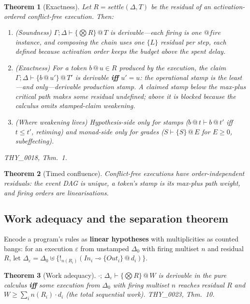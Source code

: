 \documentclass[11pt]{article}
\makeatletter
\newcommand{\lax}[2]{\{#1\}\mathbin{@}#2}       %
\newcommand{\gbang}[1]{{!}_{#1}}                 %
\newcommand{\loli}{\multimap}                    %
\newcommand{\stmp}[2]{#1\mathbin{@}#2}           %
\newcommand{\settle}{\mathit{settle}}
\newtheorem{theorem}{Theorem}[section]
\theoremstyle{definition}
\theoremstyle{remark}
\makeatother
\begin{document}
\begin{theorem}[Exactness]
\label{thm:exact}
Let $R = \settle(\Delta, T)$ be the residual of an activation-ordered
conflict-free execution.  Then:
\begin{enumerate}
\item \emph{(Soundness)} $\Gamma; \Delta \vdash \lax{\bigotimes R}{T}$ is
  derivable---each firing is one $\mathit{@fire}$ instance, and composing the chain
  uses one $\mathit{\{L\}}$ residual per step, each \emph{defined} because
  activation order keeps the budget above the spent delay.
\item \emph{(Exactness)} For a token $\stmp{b}{u} \in R$ produced by the
  execution, the claim $\Gamma; \Delta \vdash \lax{\stmp{b}{u'}}{T'}$ is derivable
  \textbf{iff} $u' = u$: the operational stamp is the least---and \emph{only}---derivable
  production stamp.  A claimed stamp below the max-plus critical path makes some
  residual undefined; above it is blocked because the calculus omits stamped-claim
  weakening.
\item \emph{(Where weakening lives)} Hypothesis-side only for stamps ($\stmp{b}{t}
  \vdash \stmp{b}{t'}$ iff $t \leq t'$, retiming) and monad-side only for grades
  ($S \vdash \lax{S}{E}$ for $E \geq 0$, subeffecting).
\end{enumerate}
THY\_0018, Thm.~1.
\end{theorem}

\begin{theorem}[Timed confluence]
\label{thm:confluence}
Conflict-free executions have order-independent residuals: the event DAG is unique,
a token's stamp is its max-plus path weight, and firing orders are linearisations.
\end{theorem}

\subsection{Work adequacy and the separation theorem}

Encode a program's rules as \textbf{linear hypotheses} with multiplicities as
counted bangs: for an execution $\varepsilon$ from unstamped $\Delta_0$ with
firing multiset $n$ and residual $R$, let $\Delta_\varepsilon = \Delta_0 \uplus
\{\gbang{n(R_i)}(In_i \loli \lax{Out_i}{d_i})\}$.

\begin{theorem}[Work adequacy]
\label{thm:work}
$\cdot;\, \Delta_\varepsilon \vdash \lax{\bigotimes R}{W}$ is derivable in the
pure calculus \textbf{iff} some execution from $\Delta_0$ with firing multiset $n$
reaches residual $R$ and $W \geq \sum_i n(R_i)\cdot d_i$ (the total sequential
work).  THY\_0023, Thm.~10.
\end{theorem}
\end{document}
